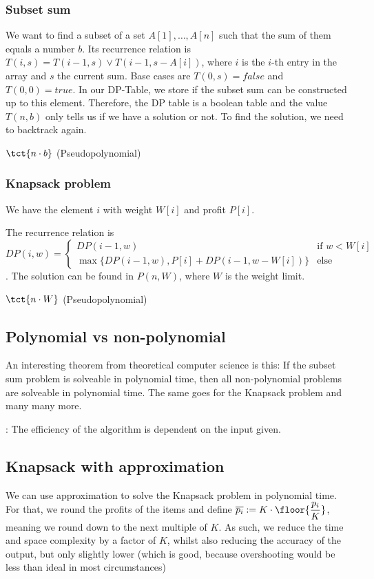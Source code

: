 \subsubsection{Subset sum}
We want to find a subset of a set $A[1], \ldots, A[n]$ such that the sum of them equals a number $b$. Its recurrence relation is $T(i, s) = T(i - 1, s) \lor T(i - 1, s - A[i])$, where $i$ is the $i$-th entry in the array and $s$ the current sum. Base cases are $T(0, s) = false$ and $T(0, 0) = true$. In our DP-Table, we store if the subset sum can be constructed up to this element. Therefore, the DP table is a boolean table and the value $T(n, b)$ only tells us if we have a solution or not. To find the solution, we need to backtrack again.

\timecomplexity $\tct{n \cdot b}$ (Pseudopolynomial)


\subsubsection{Knapsack problem}
We have the element $i$ with weight $W[i]$ and profit $P[i]$. 

The recurrence relation is $DP(i, w) = \begin{cases}
    DP(i - 1, w) & \text{if } w < W[i]\\
    \max\{DP(i - 1, w), P[i] + DP(i - 1, w - W[i])\} & \text{else}
\end{cases}$. The solution can be found in $P(n, W)$, where $W$ is the weight limit.

\timecomplexity $\tct{n \cdot W}$ (Pseudopolynomial)


\newpage
\subsection{Polynomial vs non-polynomial}
An interesting theorem from theoretical computer science is this: If the subset sum problem is solveable in polynomial time, then all non-polynomial problems are solveable in polynomial time. The same goes for the Knapsack problem and many many more.

: The efficiency of the algorithm is dependent on the input given.


\subsection{Knapsack with approximation}
We can use approximation to solve the Knapsack problem in polynomial time. For that, we round the profits of the items and define $\displaystyle \overline{p_i} := K \cdot \floor{\frac{p_i}{K}}$, meaning we round down to the next multiple of $K$. As such, we reduce the time and space complexity by a factor of $K$, whilst also reducing the accuracy of the output, but only slightly lower (which is good, because overshooting would be less than ideal in most circumstances)



